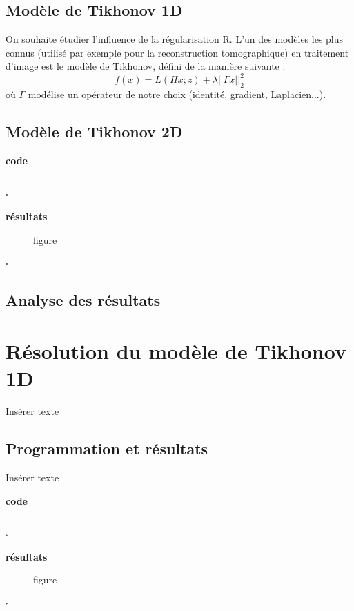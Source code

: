 \documentclass{article}
\newcommand{\debutrep}[1]{\color{blue}\begin{center} \hrulefill \textbf{ #1 } \hrulefill \end{center} }
\newcommand{\finrep}{\vspace*{5mm}\hfill $\square$\color{black}\vspace*{5mm}}
\begin{document}
\subsection{Modèle de Tikhonov 1D}
On souhaite étudier l’influence de la régularisation R. L’un des modèles les plus connus (utilisé par
exemple pour la reconstruction tomographique) en traitement d’image est le modèle de Tikhonov,
défini de la manière suivante :
\begin{equation}
f(x) = L(Hx;z) + \lambda||\Gamma x||^2_2
\end{equation}
où $\Gamma$ modélise un opérateur de notre choix (identité, gradient, Laplacien...).


\subsection{Modèle de Tikhonov 2D}
\debutrep{code}
\begin{verbatim}

\end{verbatim}
\finrep

\debutrep{résultats}
\begin{figure}[h]
\centering

\caption{figure}
\end{figure}
\finrep

\vspace*{3mm}

\subsection{Analyse des résultats}

\clearpage


\section{Résolution du modèle de Tikhonov 1D}
Insérer texte

\subsection{Programmation et résultats}
Insérer texte
\debutrep{code}
\begin{verbatim}

\end{verbatim}
\finrep

\debutrep{résultats}
\begin{figure}[h]
\centering

\caption{figure}
\end{figure}
\finrep
\end{document}
